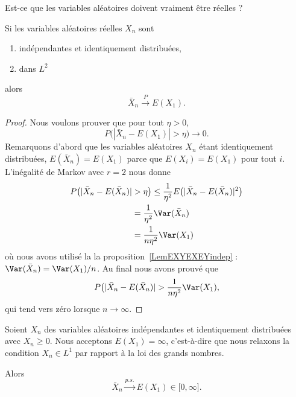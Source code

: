 \begin{probleme}
	Est-ce que les variables aléatoires doivent vraiment être réelles ?
\end{probleme}

\begin{corollary}
	Si les variables aléatoires réelles \( X_n\) sont
	\begin{enumerate}
		\item
		      indépendantes et identiquement distribuées,
		\item
		      dans \( L^2\)
	\end{enumerate}
	alors
	\begin{equation}
		\bar X_n\stackrel{P}{\longrightarrow}E(X_1).
	\end{equation}
\end{corollary}

\begin{proof}
	Nous voulons prouver que pour tout \( \eta>0\),
	\begin{equation}
		P\big( | \bar X_n-E(X_1) |>\eta \big)\to 0.
	\end{equation}
	Remarquons d'abord que les variables aléatoires \( X_n\) étant identiquement distribuées, \( E(\bar X_n)=E(X_1)\) parce que \( E(X_i)=E(X_1)\) pour tout \( i\). L'inégalité de Markov avec \( r=2\) nous donne
	\begin{subequations}
		\begin{align}
			P\big( | \bar X_n-E(\bar X_n) | & >\eta \big)\leq\frac{1}{ \eta^2 }E\big( | \bar X_n-E(\bar X_n) |^2 \big) \\
			                                & =\frac{1}{ \eta^2 } \Var(\bar X_n)                                       \\
			                                & = \frac{1}{ n\eta^2 }\Var(X_1)
		\end{align}
	\end{subequations}
	où nous avons utilisé la la proposition~\ref{LemEXYEXEYindep} : \( \Var(\bar X_n)=\Var(X_1)/n\). Au final nous avons prouvé que
	\begin{equation}
		P\big( | \bar X_n-E(\bar X_n) |>\frac{1}{ n\eta^2 }\Var(X_1),
	\end{equation}
	qui tend vers zéro lorsque \( n\to\infty\).
\end{proof}

\begin{proposition}
	Soient \( X_n\) des variables aléatoires indépendantes et identiquement distribuées avec \( X_n\geq 0\). Nous acceptons \( E(X_1)=\infty\), c'est-à-dire que nous relaxons la condition \( X_n\in L^1\) par rapport à la loi des grands nombres.

	Alors
	\begin{equation}
		\bar X_n\stackrel{p.s.}{\longrightarrow} E(X_1)\in\mathopen[ 0 , \infty \mathclose].
	\end{equation}
\end{proposition}

